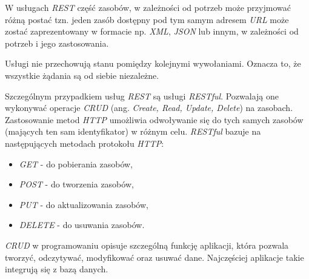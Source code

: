 W usługach \textsl{REST} część zasobów, w zależności od potrzeb może przyjmować różną postać tzn. jeden zasób dostępny pod tym samym adresem \textsl{URL} może zostać zaprezentowany w formacie np. \textsl{XML}, \textsl{JSON} lub innym, w zależności od potrzeb i jego zastosowania.

Usługi nie przechowują stanu pomiędzy kolejnymi wywołaniami. Oznacza to, że wszystkie żądania są od siebie niezależne.

Szczególnym przypadkiem usług \textsl{REST} są usługi \textsl{RESTful}. Pozwalają one wykonywać operacje \textsl{CRUD} (ang. \textsl{Create, Read, Update, Delete}) na zasobach. Zastosowanie metod \textsl{HTTP} umożliwia odwoływanie się do tych samych zasobów (mających ten sam identyfikator) w różnym celu. \textsl{RESTful} bazuje na następujących metodach protokołu \textsl{HTTP}:
\begin{itemize}
    \item \textsl{GET} - do pobierania zasobów,
    \item \textsl{POST} - do tworzenia zasobów,
    \item \textsl{PUT} - do aktualizowania zasobów,
    \item \textsl{DELETE} - do usuwania zasobów.
\end{itemize} 
\textsl{CRUD} w programowaniu opisuje szczególną funkcję aplikacji, która pozwala tworzyć, odczytywać, modyfikować oraz usuwać dane. Najczęściej aplikacje takie integrują się z bazą danych. 